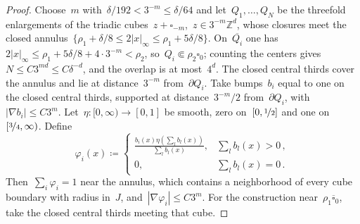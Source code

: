 \documentclass[11pt,letterpaper]{article}
\numberwithin{equation}{section}
\theoremstyle{definition}
\newcommand{\Zd}{\mathbb{Z}^d}
\newcommand{\nf}{\nicefrac}
\newcommand{\cu}{\square}
\begin{document}
\begin{proof}
Choose~$m$ with~$\delta/192<3^{-m}\leq\delta/64$ and let~$Q_1,\ldots,Q_N$ be the threefold enlargements of the triadic cubes~$z+\cu_{-m}$,~$z\in3^{-m}\Zd$, whose closures meet the closed annulus~$\{\rho_1+\delta/8\leq2|x|_\infty\leq\rho_1+5\delta/8\}$. On~$\overline{Q_i}$ one has~$2|x|_\infty\leq\rho_1+5\delta/8+4\cdot3^{-m}<\rho_2$, so~$Q_i\Subset\rho_2\cu_0$; counting the centers gives~$N\leq C3^{md}\leq C\delta^{-d}$, and the overlap is at most~$4^d$. The closed central thirds cover the annulus and lie at distance~$3^{-m}$ from~$\partial Q_i$. Take bumps~$b_i$ equal to one on the closed central thirds, supported at distance~$3^{-m}/2$ from~$\partial Q_i$, with~$|\nabla b_i|\leq C3^m$. Let~$\eta:[0,\infty)\to[0,1]$ be smooth, zero on~$[0,\nf12]$ and one on~$[\nf34,\infty)$. Define
\begin{equation*}
	\varphi_i(x)\coloneqq
	\begin{cases}
		\displaystyle\frac{b_i(x)\eta(\sum_l b_l(x))}{\sum_l b_l(x)},&\sum_l b_l(x)>0\,,\\[6pt]
		0,&\sum_l b_l(x)=0\,.
	\end{cases}
\end{equation*}
Then~$\sum_i\varphi_i=1$ near the annulus, which contains a neighborhood of every cube boundary with radius in~$J$, and~$|\nabla\varphi_i|\leq C3^m$. For the construction near~$\rho_1\overline{\cu}_0$, take the closed central thirds meeting that cube.

\smallskip


\end{proof}
\end{document}
